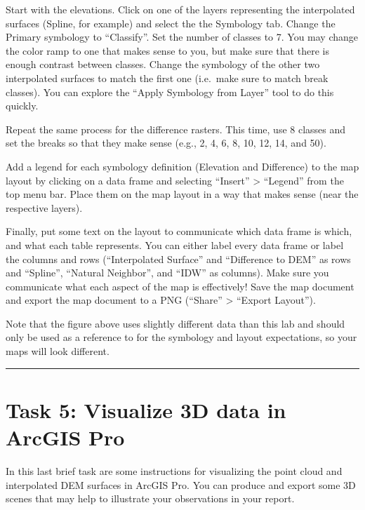 \documentclass[
]{book}
\begin{document}
Start with the elevations. Click on one of the layers representing the interpolated surfaces (Spline, for example) and select the the Symbology tab. Change the Primary symbology to ``Classify''. Set the number of classes to 7. You may change the color ramp to one that makes sense to you, but make sure that there is enough contrast between classes. Change the symbology of the other two interpolated surfaces to match the first one (i.e.~make sure to match break classes). You can explore the ``Apply Symbology from Layer'' tool to do this quickly.

Repeat the same process for the difference rasters. This time, use 8 classes and set the breaks so that they make sense (e.g., 2, 4, 6, 8, 10, 12, 14, and 50).

Add a legend for each symbology definition (Elevation and Difference) to the map layout by clicking on a data frame and selecting ``Insert'' \textgreater{} ``Legend'' from the top menu bar. Place them on the map layout in a way that makes sense (near the respective layers).

Finally, put some text on the layout to communicate which data frame is which, and what each table represents. You can either label every data frame or label the columns and rows (``Interpolated Surface'' and ``Difference to DEM'' as rows and ``Spline'', ``Natural Neighbor'', and ``IDW'' as columns). Make sure you communicate what each aspect of the map is effectively! Save the map document and export the map document to a PNG (``Share'' \textgreater{} ``Export Layout'').

Note that the figure above uses slightly different data than this lab and should only be used as a reference to for the symbology and layout expectations, so your maps will look different.

\begin{center}\rule{0.5\linewidth}{0.5pt}\end{center}

\hypertarget{task-5-visualize-3d-data-in-arcgis-pro}{%
\section*{Task 5: Visualize 3D data in ArcGIS Pro}\label{task-5-visualize-3d-data-in-arcgis-pro}}

In this last brief task are some instructions for visualizing the point cloud and interpolated DEM surfaces in ArcGIS Pro. You can produce and export some 3D scenes that may help to illustrate your observations in your report.
\end{document}
